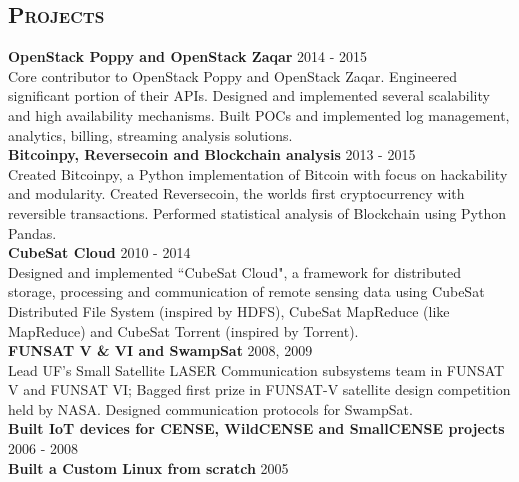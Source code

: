 \begin{resume}
\section{\textsc{Projects}}
\textbf{OpenStack Poppy and OpenStack Zaqar} \hfill 2014 - 2015\\
Core contributor to OpenStack Poppy and OpenStack Zaqar. Engineered significant portion of their APIs. Designed and implemented several scalability and high availability mechanisms. Built POCs and implemented log management, analytics, billing, streaming analysis solutions.\\
\textbf{Bitcoinpy, Reversecoin and Blockchain analysis} \hfill 2013 - 2015\\
Created Bitcoinpy, a Python implementation of Bitcoin with focus on hackability and modularity. Created Reversecoin, the worlds first cryptocurrency with reversible transactions. Performed statistical analysis of Blockchain using Python Pandas.\\
\textbf{CubeSat Cloud} \hfill 2010 - 2014 \\
Designed and implemented ``CubeSat Cloud", a framework for distributed storage, processing and communication of remote sensing data using CubeSat Distributed File System (inspired by HDFS), CubeSat MapReduce (like MapReduce) and CubeSat Torrent (inspired by Torrent).\\
\textbf{FUNSAT V \& VI and SwampSat} \hfill 2008, 2009 \\
Lead UF's Small Satellite LASER Communication subsystems team in FUNSAT V and FUNSAT VI; Bagged first prize in FUNSAT-V satellite design competition held by NASA. Designed communication protocols for SwampSat.\\
\textbf{Built IoT devices for CENSE, WildCENSE and SmallCENSE projects} \hfill 2006 - 2008\\
\textbf{Built a Custom Linux from scratch} \hfill 2005







\end{resume}
